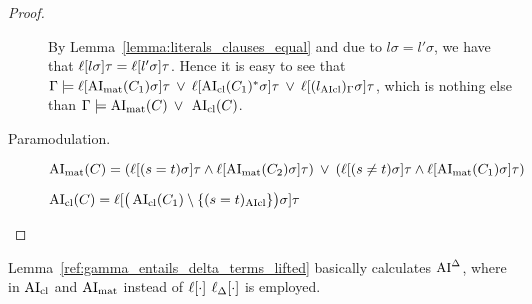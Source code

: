 \documentclass[,%
	paper=a4,%
	DIV14, %
	twoside=false,%
	liststotoc,
	bibtotoc,
	draft=false,%
	numbers=noendperiod
]{scrartcl}
\begin{document}
\begin{proof}
\begin{description}
			By Lemma~\ref{lemma:literals_clauses_equal} and due to $l\sigma = l'\sigma$, we have that $\ell[l\sigma]\tau = \ell[l'\sigma]\tau$.
			Hence it is easy to see that 
			$\Gamma \models \ell[\operatorname{AI}_\mathrm{mat}(C_1)\sigma]\tau \;\,{\lor}\;\, \ell[\operatorname{AI}_\mathrm{cl}(C_1)^*\sigma]\tau \;\,{\lor}\;\, \ell[(l_{\operatorname{AIcl}})_\Gamma\sigma]\tau $, which is nothing else than $\Gamma\entails\nolinebreak \AImatrix(C) \spam\lor \AIclause(C)$.

		\item[Paramodulation.]\hfill
			\begin{prooftree}
			\end{prooftree}

			$\operatorname{AI}_\mathrm{mat}(C) = (\ell[(s=t)\sigma]\tau \land \ell[\operatorname{AI}_\mathrm{mat}(C_2)\sigma]\tau ) \;\,{\lor}\;\, (\ell[(s\neq t)\sigma]\tau \land \ell[\operatorname{AI}_\mathrm{mat}(C_1)\sigma]\tau )$

		$\operatorname{AI}_\mathrm{cl}(C) = \ell[ \big(\operatorname{AI}_\mathrm{cl}(C_1) \setminus \{(s=t)_{\operatorname{AIcl}}\}\big)\sigma]\tau$



					\qedhere
	\end{description}
\end{proof}

\begin{conj}
	Lemma~\ref{ref:gamma_entails_delta_terms_lifted} basically calculates $\operatorname{AI}^\Delta$, where in $\operatorname{AI}_\mathrm{cl}$ and $\operatorname{AI}_\mathrm{mat}$ instead of $\ell[\cdot]$ $\ell_{\Delta}[\cdot]$ is employed.
\end{conj}
\end{document}
